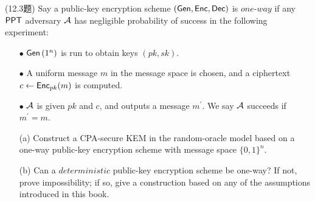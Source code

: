 \begin{questions}
    \question (12.3题) Say a public-key encryption scheme $(\mathsf{Gen},\mathsf{Enc},\mathsf{Dec})$ is $one$-$way$ if any $\mathsf{PPT}$ adversary $\mathcal{A}$ has negligible probability of success in the following experiment:

        \begin{enumerate}
            \item[$\bullet$] $\mathsf{Gen}\left(1^{n}\right)$ is run to obtain keys $(pk,sk)$.
            \item[$\bullet$] A uniform message $m$ in the message space is chosen, and a ciphertext $c\leftarrow\mathsf{Enc}_{pk}(m)$ is computed.
            \item[$\bullet$] $\mathcal{A}$ is given $pk$ and $c$, and outputs a message $m^{'}$. We say $\mathcal{A}$ succeeds if $m^{'}=m$.
        \end{enumerate}

        \begin{enumerate}
            \item[(a)] Construct a CPA-secure KEM in the random-oracle model based on a one-way public-key encryption scheme with message space $\{0,1\}^n$.
            \item[(b)] Can a $deterministic$ public-key encryption scheme be one-way? If not, prove impossibility; if so, give a construction based on any of the assumptions introduced in this book.
        \end{enumerate}


\end{questions}
